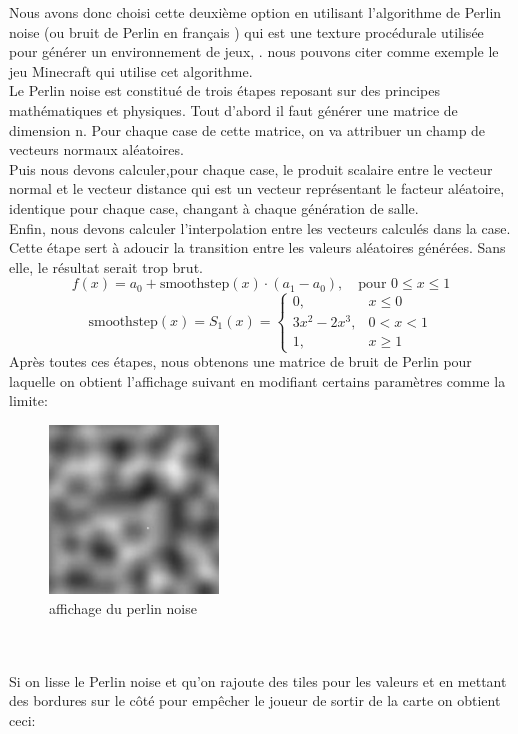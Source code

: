 \documentclass[a4paper,11pt]{article}
\begin{document}
Nous avons donc choisi cette deuxième option en utilisant l'algorithme de Perlin noise (ou bruit de Perlin en français ) qui est une texture procédurale  utilisée pour générer un environnement de jeux, . nous pouvons citer comme exemple le jeu Minecraft qui utilise cet algorithme.\\
Le Perlin noise est constitué de trois étapes reposant sur des principes mathématiques et physiques. Tout d'abord il faut générer une matrice de dimension n. Pour chaque case de cette matrice, on va attribuer un champ de vecteurs normaux aléatoires.\\
Puis nous devons calculer,pour chaque case, le produit scalaire entre le vecteur normal et le vecteur distance qui est un vecteur représentant le facteur aléatoire, identique pour chaque case, changant à chaque génération de salle.\\
Enfin, nous devons calculer l'interpolation entre les vecteurs calculés dans la case. Cette étape sert à adoucir la transition entre les valeurs aléatoires générées. Sans elle, le résultat serait trop brut.\\
\[
f(x) = a_{0} + \text{smoothstep}(x) \cdot (a_{1} - a_{0}), \quad \text{pour } 0 \leq x \leq 1
\]
\begin{equation*}
\text{smoothstep}(x) =
S_1(x) =
\begin{cases} 
0, & x \leq 0 \\ 
3x^2 - 2x^3, & 0 < x < 1 \\ 
1, & x \geq 1
\end{cases}
\end{equation*}
Après toutes ces étapes, nous obtenons une matrice de bruit de Perlin pour laquelle on obtient l'affichage suivant en modifiant certains paramètres comme la limite:\
\begin{figure}[h]
\centering
\includegraphics[width=0.4\textwidth]{./img/perlin.jpg}
\caption{affichage du perlin noise}
\label{fig:affichage perlin}
\end{figure}
\\\\
\newpage
Si on lisse le Perlin noise et qu'on rajoute des tiles pour les valeurs et en mettant des bordures sur le côté pour empêcher le joueur de sortir de la carte on obtient ceci:\\
\end{document}
